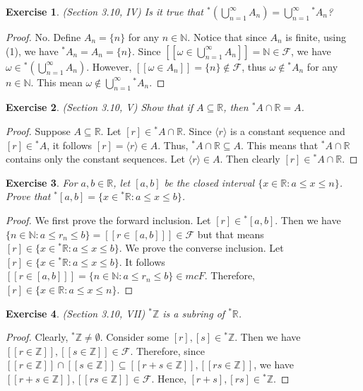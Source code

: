 \documentclass[a4paper, 11pt, openany]{book}
\theoremstyle{plain}
\newtheorem{exercise}{Exercise}[chapter]
\theoremstyle{plain}
\newcommand{\mc}{\mathcal}
\newcommand{\N}{\mathbb{N}}
\newcommand{\Z}{\mathbb{Z}}
\newcommand{\R}{\mathbb{R}}
\newcommand{\la}{\langle}
\newcommand{\ra}{\rangle}
\newcommand{\hyp}{{}^*}
\begin{document}
  \begin{exercise}
    (Section 3.10, IV)
    Is it true that $\hyp (\bigcup_{n=1}^\infty A_n)=\bigcup_{n=1}^\infty \hyp A_n$?
  \end{exercise}
  \begin{proof}
    No. Define $A_n=\{n\}$ for any $n \in \N$. Notice that since $A_n$ is finite, using (1), we have $\hyp A_n=A_n=\{n\}$. Since $[[\omega \in \bigcup_{n=1}^\infty A_n]]=\N \in \mc{F}$, we have $\omega \in \hyp (\bigcup_{n=1}^\infty A_n)$. However, $[[\omega \in A_n]]=\{n\} \notin \mc{F}$, thus $\omega \notin \hyp A_n$ for any $n \in \N$. This mean $\omega \notin \bigcup_{n=1}^\infty \hyp A_n$.
  \end{proof}

  \begin{exercise}
    (Section 3.10, V)
    Show that if $A \subseteq \R$, then $\hyp A \cap \R =A$.
  \end{exercise}
  \begin{proof}
    Suppose $A \subseteq \R$. Let $[r] \in \hyp A \cap \R$. Since $\la r \ra$ is a constant sequence and $[r] \in \hyp A$, it follows $[r]=\la r \ra \in A$. Thus, $\hyp A \cap \R \subseteq A$. This means that $\hyp A \cap \R$ contains only the constant sequences. Let $\la r \ra \in A$. Then clearly $[r] \in \hyp A \cap \R$.
  \end{proof}

  \begin{exercise}
    For $a,b \in \R$, let $[a,b]$ be the closed interval $\{x \in \R: a \leq x \leq n\}$. Prove that $\hyp [a,b]=\{x \in \hyp \R: a \leq x \leq b\}$.
  \end{exercise}
  \begin{proof}
    We first prove the forward inclusion. Let $[r] \in \hyp [a,b]$. Then we have $\{n \in \N: a \leq r_n \leq b\}=[[r \in [a,b]]] \in \mc{F}$ but that means $[r] \in \{x \in \hyp \R: a \leq x \leq b\}$. We prove the converse inclusion. Let $[r] \in \{x \in \hyp \R: a \leq x \leq b\}$. It follows $[[r \in [a,b]]]=\{n \in \N: a \leq r_n \leq b\} \in mc{F}$. Therefore, $[r] \in \{x \in \R: a \leq x \leq n\}$.
  \end{proof}

  \begin{exercise}
    (Section 3.10, VII) 
    $\hyp \Z$ is a subring of $\hyp \R$.
  \end{exercise}
  \begin{proof}
    Clearly, $\hyp \Z \not = \emptyset$. Consider some $[r], [s] \in \hyp \Z$. Then we have $[[r \in \Z]], [[s \in \Z]] \in \mc{F}$. Therefore, since $[[r \in \Z]] \cap [[s \in \Z]] \subseteq [[r+s \in \Z]], [[rs \in \Z]]$, we have $[[r+s \in \Z]], [[rs \in \Z]] \in \mc{F}$. Hence, $[r+s], [rs] \in \hyp \Z$.
  \end{proof}
\end{document}
